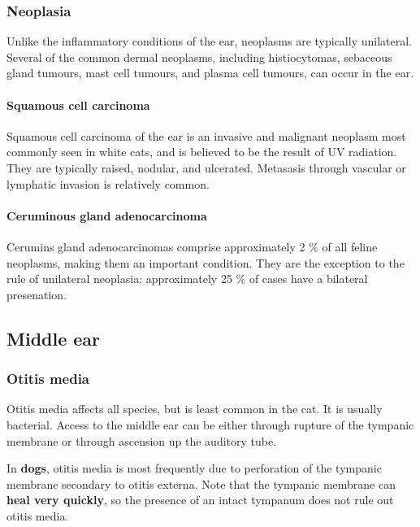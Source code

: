 \documentclass[
  openany]{article}
\begin{document}
\hypertarget{neoplasia}{%
\subsubsection{Neoplasia}\label{neoplasia}}

Unlike the inflammatory conditions of the ear, neoplasms are typically unilateral. Several of the common dermal neoplasms, including histiocytomas, sebaceous gland tumours, mast cell tumours, and plasma cell tumours, can occur in the ear.

\hypertarget{squamous-cell-carcinoma}{%
\paragraph{Squamous cell carcinoma}\label{squamous-cell-carcinoma}}

Squamous cell carcinoma of the ear is an invasive and malignant neoplasm most commonly seen in white cats, and is believed to be the result of UV radiation. They are typically raised, nodular, and ulcerated. Metasasis through vascular or lymphatic invasion is relatively common.

\hypertarget{ceruminous-gland-adenocarcinoma}{%
\paragraph{Ceruminous gland adenocarcinoma}\label{ceruminous-gland-adenocarcinoma}}

Cerumins gland adenocarcinomas comprise approximately 2 \% of all feline neoplasms, making them an important condition. They are the exception to the rule of unilateral neoplasia: approximately 25 \% of cases have a bilateral presenation.

\hypertarget{middle-ear}{%
\subsection{Middle ear}\label{middle-ear}}

\hypertarget{otitis-media}{%
\subsubsection{Otitis media}\label{otitis-media}}

Otitis media affects all species, but is least common in the cat. It is usually bacterial. Access to the middle ear can be either through rupture of the tympanic membrane or through ascension up the auditory tube.

In \textbf{dogs}, otitis media is most frequently due to perforation of the tympanic membrane secondary to otitis externa. Note that the tympanic membrane can \textbf{heal very quickly}, so the presence of an intact tympanum does not rule out otitis media.
\end{document}

